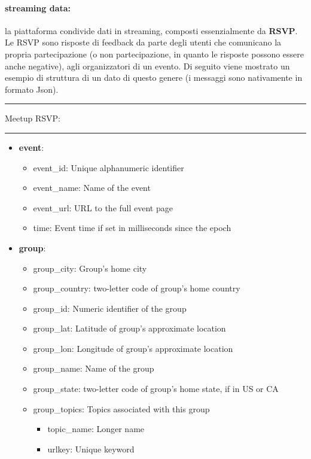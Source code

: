 \documentclass[fleqn,10pt]{SelfArx} %
\begin{document}
{\paragraph{streaming data:} 
la piattaforma condivide dati in streaming, composti essenzialmente da \textbf{RSVP}.
Le RSVP sono risposte di feedback da parte degli utenti che comunicano la propria partecipazione (o non partecipazione, in quanto le risposte possono essere anche negative), agli organizzatori di un evento.
Di seguito viene mostrato un esempio di struttura di un dato di questo genere (i messaggi sono nativamente in formato Json).%
\vspace*{0.5cm}
\hrule
\vspace*{0.1cm}
Meetup RSVP:
\vspace*{0.05cm}
\hrule
\begin{itemize}[noitemsep]
\item \textbf{event}:
	\begin{itemize}[noitemsep]
	\item event\_id:	Unique alphanumeric identifier
	\item event\_name: Name of the event
	\item event\_url: URL to the full event page
	\item time: Event time if set in milliseconds since the epoch
	\end{itemize}
\item \textbf{group}:
	\begin{itemize}[noitemsep]
    \item group\_city: Group's home city
    \item group\_country: two-letter code of group's home country
    \item group\_id: Numeric identifier of the group
    \item group\_lat: Latitude of group's approximate location
    \item group\_lon: Longitude of group's approximate location
    \item group\_name: Name of the group
    \item group\_state: two-letter code of group's home state, if in US or CA
    \item group\_topics: Topics associated with this group
			\begin{itemize}[noitemsep]
			\item topic\_name: Longer name
        	\item urlkey: Unique keyword

\end{itemize}
\end{itemize}
\end{itemize}}
\end{document}
